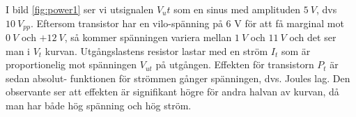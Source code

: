 I bild \ref{fig:power1} ser vi utsignalen \(V_ut\) som en sinus med amplituden
\(5\ V\), dvs \(10\ V_{pp}\). Eftersom transistor har en vilo-spänning på 6 V
för att få marginal mot \(0\ V\) och \(+12\ V\), så kommer spänningen variera
mellan \(1\ V\) och \(11\ V\) och det ser man i \(V_t\) kurvan. Utgångslastens
resistor lastar med en ström \(I_t\) som är proportionelig mot spänningen
\(V_{ut}\) på utgången. Effekten för transistorn \(P_t\) är sedan absolut-
funktionen för strömmen gånger spänningen, dvs. Joules lag. Den observante ser
att effekten är signifikant högre för andra halvan av kurvan, då man har både
hög spänning och hög ström.
